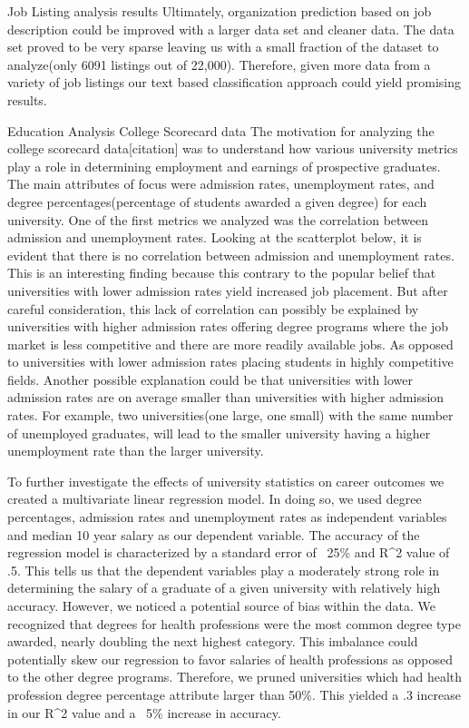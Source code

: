 Job Listing analysis results
Ultimately, organization prediction based on job description could be improved with a larger data set and cleaner data. The data set proved to be very sparse leaving us with a small fraction of the dataset to analyze(only 6091 listings out of 22,000). Therefore, given more data from a variety of job listings our text based classification approach could yield promising results.

Education Analysis
College Scorecard data
The motivation for analyzing the college scorecard data[citation] was to understand how various university metrics play a role in determining employment and earnings of prospective graduates. The main attributes of focus were admission rates, unemployment rates, and degree percentages(percentage of students awarded a given degree) for each university. One of the first metrics we analyzed was the correlation between admission and unemployment rates. Looking at the scatterplot below, it is evident that there is no correlation between admission and unemployment rates. This is an interesting finding because this contrary to the popular belief that universities with lower admission rates yield increased job placement. But after careful consideration, this lack of correlation can possibly be explained by universities with higher admission rates offering degree programs where the job market is less competitive and there are more readily available jobs. As opposed to universities with lower admission rates placing students in highly competitive fields. Another possible explanation could be that universities with lower admission rates are on average smaller than universities with higher admission rates. For example, two universities(one large, one small) with the same number of unemployed graduates, will lead to the smaller university having a higher unemployment rate than the larger university.

To further investigate the effects of university statistics on career outcomes we created a multivariate linear regression model. In doing so, we used degree percentages, admission rates and unemployment rates as independent variables and median 10 year salary as our dependent variable. The accuracy of the regression model is characterized by a standard error of ~25\% and R^2 value of .5. This tells us that the dependent variables play a moderately strong role in determining the salary of a graduate of a given university with relatively high accuracy. However, we noticed a potential source of bias within the data. We recognized that degrees for health professions were the most common degree type awarded, nearly doubling the next highest category. This imbalance could potentially skew our regression to favor salaries of health professions as opposed to the other degree programs. Therefore, we pruned universities which had health profession degree percentage attribute larger than 50\%. This yielded a .3 increase in our R^2 value and a ~5\% increase in accuracy.


